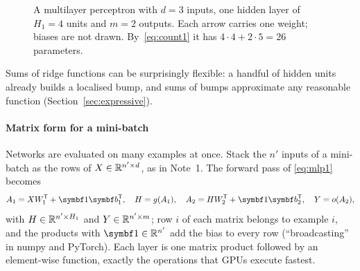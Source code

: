 \documentclass[11pt]{article}
\newcommand{\hv}{\vect{h}}
\newcommand{\y}{\vect{y}}
\newcommand{\vb}{\vect{b}}
\begin{document}
\begin{figure}[htbp]
\centering
{}
\caption{A multilayer perceptron with $d = 3$ inputs, one hidden layer of $H_1 = 4$ units and $m = 2$ outputs. Each
arrow carries one weight; biases are not drawn. By~\eqref{eq:count1} it has $4 \cdot 4 + 2 \cdot 5 = 26$ parameters.}
\label{fig:mlp}
\end{figure}

Sums of ridge functions can be surprisingly flexible: a handful of hidden units already builds a localised bump, and
sums of bumps approximate any reasonable function (Section~\ref{sec:expressive}).

\paragraph{Matrix form for a mini-batch} Networks are evaluated on many examples at once. Stack the $n'$ inputs of a
mini-batch as the rows of $X \in \mathbb{R}^{n' \times d}$, as in Note~1. The forward pass of \eqref{eq:mlp1} becomes
\begin{equation}\label{eq:batch}
  A_1 = XW_1\T + \vect{1}\vb_1\T, \quad H = g(A_1), \quad A_2 = HW_2\T + \vect{1}\vb_2\T, \quad Y = o(A_2),
\end{equation}
with $H \in \mathbb{R}^{n' \times H_1}$ and $Y \in \mathbb{R}^{n' \times m}$; row $i$ of each matrix belongs to example $i$, and the
products with $\vect{1} \in \R^{n'}$ add the bias to every row (``broadcasting'' in numpy and PyTorch). Each layer is
one matrix product followed by an element-wise function, exactly the operations that GPUs execute fastest.
\end{document}
